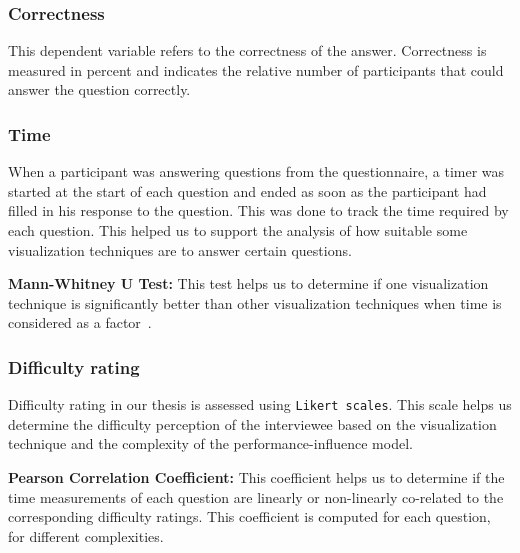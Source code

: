 \subsubsection*{Correctness}
This dependent variable refers to the correctness of the answer. Correctness is measured in percent and indicates the relative number of participants that could answer the question correctly. 

\subsubsection*{Time}
When a participant was answering questions from the questionnaire, a timer was started at the start of each question and ended as soon as the participant had filled in his response to the question. This was done to track the time required by each question.
This helped us to support the analysis of how suitable some visualization techniques are to answer certain questions.

\begin{myindentpar}{0.5cm}
  \textbf{Mann-Whitney U Test:} This test helps us to determine if one visualization technique is significantly better than other visualization techniques when time is considered as a factor~\cite{DBLP:conf/eusflat/GrzegorzewskiS17}.
\end{myindentpar}   

\subsubsection*{Difficulty rating}
Difficulty rating in our thesis is assessed using \texttt{Likert scales}. This scale helps us determine the difficulty perception of the interviewee based on the visualization technique and the complexity of the performance-influence model.

\begin{myindentpar}{0.5cm}
  \textbf{Pearson Correlation Coefficient:} This coefficient helps us to determine if the time measurements of each question are linearly or non-linearly co-related to the corresponding difficulty ratings. This coefficient is computed for each question, for different complexities.
\end{myindentpar}







 
